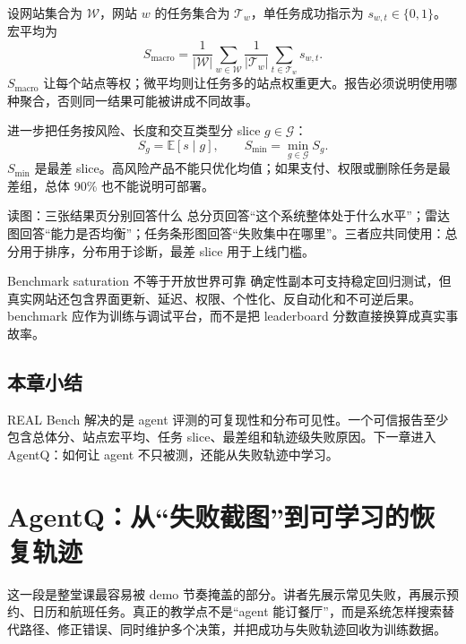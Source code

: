 \documentclass[a4paper]{article}
\begin{document}
设网站集合为 $\mathcal{W}$，网站 $w$ 的任务集合为 $\mathcal{T}_w$，单任务成功指示为 $s_{w,t}\in\{0,1\}$。宏平均为
\[
S_{\text{macro}}=\frac{1}{|\mathcal{W}|}\sum_{w\in\mathcal{W}}
\frac{1}{|\mathcal{T}_w|}\sum_{t\in\mathcal{T}_w}s_{w,t}.
\]
$S_{\text{macro}}$ 让每个站点等权；微平均则让任务多的站点权重更大。报告必须说明使用哪种聚合，否则同一结果可能被讲成不同故事。

进一步把任务按风险、长度和交互类型分 slice $g\in\mathcal{G}$：
\[
S_g=\mathbb{E}[s\mid g],\qquad
S_{\min}=\min_{g\in\mathcal{G}}S_g.
\]
$S_{\min}$ 是最差 slice。高风险产品不能只优化均值；如果支付、权限或删除任务是最差组，总体 90\% 也不能说明可部署。

\begin{knowledgebox}{读图：三张结果页分别回答什么}
总分页回答“这个系统整体处于什么水平”；雷达图回答“能力是否均衡”；任务条形图回答“失败集中在哪里”。三者应共同使用：总分用于排序，分布用于诊断，最差 slice 用于上线门槛。
\end{knowledgebox}

\begin{warningbox}{Benchmark saturation 不等于开放世界可靠}
确定性副本可支持稳定回归测试，但真实网站还包含界面更新、延迟、权限、个性化、反自动化和不可逆后果。benchmark 应作为训练与调试平台，而不是把 leaderboard 分数直接换算成真实事故率。
\end{warningbox}


\subsection{本章小结}

REAL Bench 解决的是 agent 评测的可复现性和分布可见性。一个可信报告至少包含总体分、站点宏平均、任务 slice、最差组和轨迹级失败原因。下一章进入 AgentQ：如何让 agent 不只被测，还能从失败轨迹中学习。

\section{AgentQ：从“失败截图”到可学习的恢复轨迹}

这一段是整堂课最容易被 demo 节奏掩盖的部分。讲者先展示常见失败，再展示预约、日历和航班任务。真正的教学点不是“agent 能订餐厅”，而是系统怎样搜索替代路径、修正错误、同时维护多个决策，并把成功与失败轨迹回收为训练数据。
\end{document}
